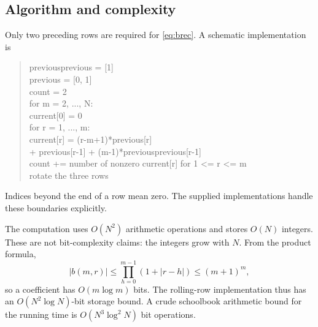 \documentclass[11pt,a4paper]{article}
\numberwithin{equation}{section}
\theoremstyle{definition}
\theoremstyle{remark}
\begin{document}
\subsection{Algorithm and complexity}
Only two preceding rows are required for \eqref{eq:brec}. A schematic
implementation is
\begin{quote}\ttfamily\small
previousprevious = [1]\\
previous = [0, 1]\\
count = 2\\
for m = 2, ..., N:\\
\hspace*{1em}current[0] = 0\\
\hspace*{1em}for r = 1, ..., m:\\
\hspace*{2em}current[r] = (r-m+1)*previous[r]\\
\hspace*{3em}+ previous[r-1] + (m-1)*previousprevious[r-1]\\
\hspace*{1em}count += number of nonzero current[r] for 1 <= r <= m\\
\hspace*{1em}rotate the three rows
\end{quote}
Indices beyond the end of a row mean zero. The supplied implementations
handle these boundaries explicitly.

The computation uses $O(N^2)$ arithmetic operations and stores $O(N)$
integers. These are not bit-complexity claims: the integers grow with $N$.
From the product formula,
\[
 |b(m,r)|\le\prod_{h=0}^{m-1}(1+|r-h|)\le(m+1)^m,
\]
so a coefficient has $O(m\log m)$ bits. The rolling-row implementation thus
has an $O(N^2\log N)$-bit storage bound. A crude schoolbook arithmetic bound
for the running time is $O(N^3\log^2 N)$ bit operations.
\end{document}
